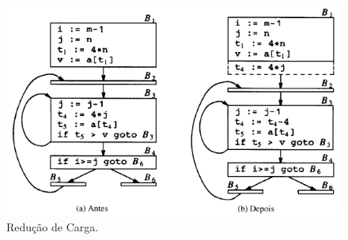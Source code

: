 \documentclass[12pt]{article}
\begin{document}
\begin{figure}[!htb]
    \centering
    \includegraphics[scale=0.9]{Imagens/reducao_carga.png}
    \centering
    \caption{Redução de Carga.}
    \label{reducao}
\end{figure}



\end{document}
